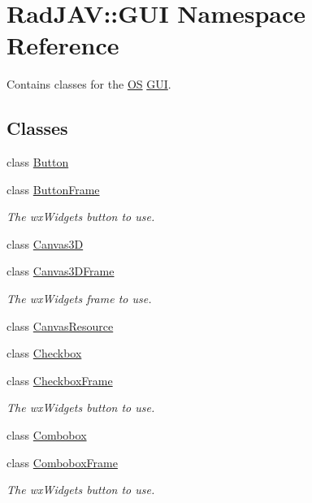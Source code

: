 \hypertarget{namespace_rad_j_a_v_1_1_g_u_i}{}\section{Rad\+J\+AV\+:\+:G\+UI Namespace Reference}
\label{namespace_rad_j_a_v_1_1_g_u_i}


Contains classes for the \mbox{\hyperlink{class_rad_j_a_v_1_1_o_s}{OS}} \mbox{\hyperlink{namespace_rad_j_a_v_1_1_g_u_i}{G\+UI}}.  


\subsection*{Classes}
\begin{DoxyCompactItemize}
\item 
class \mbox{\hyperlink{class_rad_j_a_v_1_1_g_u_i_1_1_button}{Button}}
\item 
class \mbox{\hyperlink{class_rad_j_a_v_1_1_g_u_i_1_1_button_frame}{Button\+Frame}}
\begin{DoxyCompactList}\small\item\em The wx\+Widgets button to use. \end{DoxyCompactList}\item 
class \mbox{\hyperlink{class_rad_j_a_v_1_1_g_u_i_1_1_canvas3_d}{Canvas3D}}
\item 
class \mbox{\hyperlink{class_rad_j_a_v_1_1_g_u_i_1_1_canvas3_d_frame}{Canvas3\+D\+Frame}}
\begin{DoxyCompactList}\small\item\em The wx\+Widgets frame to use. \end{DoxyCompactList}\item 
class \mbox{\hyperlink{class_rad_j_a_v_1_1_g_u_i_1_1_canvas_resource}{Canvas\+Resource}}
\item 
class \mbox{\hyperlink{class_rad_j_a_v_1_1_g_u_i_1_1_checkbox}{Checkbox}}
\item 
class \mbox{\hyperlink{class_rad_j_a_v_1_1_g_u_i_1_1_checkbox_frame}{Checkbox\+Frame}}
\begin{DoxyCompactList}\small\item\em The wx\+Widgets button to use. \end{DoxyCompactList}\item 
class \mbox{\hyperlink{class_rad_j_a_v_1_1_g_u_i_1_1_combobox}{Combobox}}
\item 
class \mbox{\hyperlink{class_rad_j_a_v_1_1_g_u_i_1_1_combobox_frame}{Combobox\+Frame}}
\begin{DoxyCompactList}\small\item\em The wx\+Widgets button to use. \end{DoxyCompactList}\item 

\end{DoxyCompactItemize}
